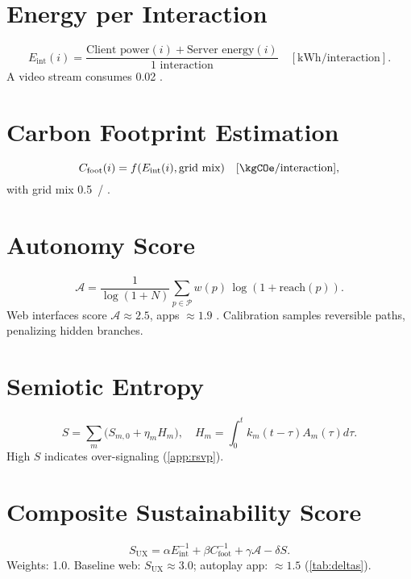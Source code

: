 \documentclass[openany]{book}
\newcommand{\Sent}{S} %
\newcommand{\Eint}{E_{\mathrm{int}}} %
\newcommand{\Cfoot}{C_{\mathrm{foot}}} %
\newcommand{\Auton}{\mathcal{A}} %
\newcommand{\SUX}{S_{\mathrm{UX}}} %
\newcommand{\kWh}{\mathrm{kWh}}
\begin{document}
{{{\section{Energy per Interaction}
\label{sec:metrics-energy}
\begin{equation}
\label{eq:Eint}
\Eint(i) = \frac{\text{Client power}(i) + \text{Server energy}(i)}{\text{1 interaction}} \quad [\kWh/\text{interaction}].
\end{equation}
A video stream consumes \SI{0.02}{\kWh} \citep{extentia2024}.

\section{Carbon Footprint Estimation}
\label{sec:metrics-carbon}
\begin{equation}
\label{eq:Cfoot}
\Cfoot(i) = f(\Eint(i), \text{grid mix}) \quad [\kgCOe/\text{interaction}],
\end{equation}
with grid mix \SI{0.5}{\kgCOe/\kWh} \citep{colak2024}.

\section{Autonomy Score}
\label{sec:metrics-autonomy}
\begin{equation}
\label{eq:metrics-autonomy}
\Auton = \frac{1}{\log(1+N)}\sum_{p\in \mathcal{P}} w(p)\,\log(1+\mathrm{reach}(p)).
\end{equation}
Web interfaces score \(\Auton \approx 2.5\), apps \(\approx 1.9\) \citep{doctorow2022}. Calibration samples reversible paths, penalizing hidden branches.

\section{Semiotic Entropy}
\label{sec:metrics-entropy}
\begin{equation}
\label{eq:metrics-S}
\Sent = \sum_m \big(S_{m,0} + \eta_m H_m\big), \quad H_m = \int_0^t k_m(t-\tau) A_m(\tau) d\tau.
\end{equation}
High \(\Sent\) indicates over-signaling (\cref{app:rsvp}).

\section{Composite Sustainability Score}
\label{sec:metrics-composite}
\begin{equation}
\label{eq:metrics-SUX}
\SUX = \alpha \Eint^{-1} + \beta \Cfoot^{-1} + \gamma \Auton - \delta \Sent.
\end{equation}
Weights: 1.0. Baseline web: \(\SUX \approx 3.0\); autoplay app: \(\approx 1.5\) (\cref{tab:deltas}).

}}}
\end{document}

